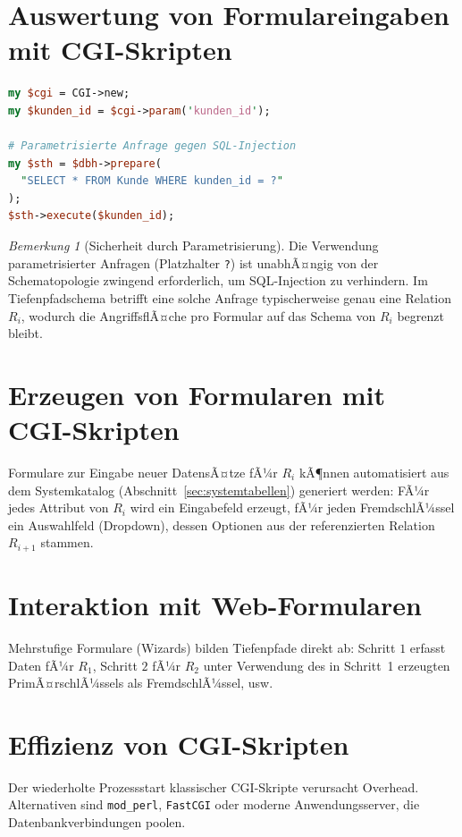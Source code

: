 ﻿\documentclass[a4paper,12pt]{report}
\theoremstyle{definition}
\theoremstyle{remark}
\newtheorem{remark}{Bemerkung}[chapter]
\begin{document}
\section{Auswertung von Formulareingaben mit CGI-Skripten}

\begin{lstlisting}[language=Perl]
my $cgi = CGI->new;
my $kunden_id = $cgi->param('kunden_id');

# Parametrisierte Anfrage gegen SQL-Injection
my $sth = $dbh->prepare(
  "SELECT * FROM Kunde WHERE kunden_id = ?"
);
$sth->execute($kunden_id);
\end{lstlisting}

\begin{remark}[Sicherheit durch Parametrisierung]
Die Verwendung parametrisierter Anfragen (Platzhalter \texttt{?}) ist
unabhÃ¤ngig von der Schematopologie zwingend erforderlich, um
SQL-Injection zu verhindern. Im Tiefenpfadschema betrifft eine solche
Anfrage typischerweise genau eine Relation $R_i$, wodurch die
AngriffsflÃ¤che pro Formular auf das Schema von $R_i$ begrenzt bleibt.
\end{remark}

\section{Erzeugen von Formularen mit CGI-Skripten}

Formulare zur Eingabe neuer DatensÃ¤tze fÃ¼r $R_i$ kÃ¶nnen automatisiert
aus dem Systemkatalog (Abschnitt~\ref{sec:systemtabellen}) generiert
werden: FÃ¼r jedes Attribut von $R_i$ wird ein Eingabefeld erzeugt, fÃ¼r
jeden FremdschlÃ¼ssel ein Auswahlfeld (Dropdown), dessen Optionen aus
der referenzierten Relation $R_{i+1}$ stammen.

\section{Interaktion mit Web-Formularen}

Mehrstufige Formulare (Wizards) bilden Tiefenpfade direkt ab: Schritt
$1$ erfasst Daten fÃ¼r $R_1$, Schritt $2$ fÃ¼r $R_2$ unter Verwendung des
in Schritt~1 erzeugten PrimÃ¤rschlÃ¼ssels als FremdschlÃ¼ssel, usw.

\section{Effizienz von CGI-Skripten}

Der wiederholte Prozessstart klassischer CGI-Skripte verursacht
Overhead. Alternativen sind \texttt{mod\_perl}, \texttt{FastCGI} oder
moderne Anwendungsserver, die Datenbankverbindungen poolen.
\end{document}
